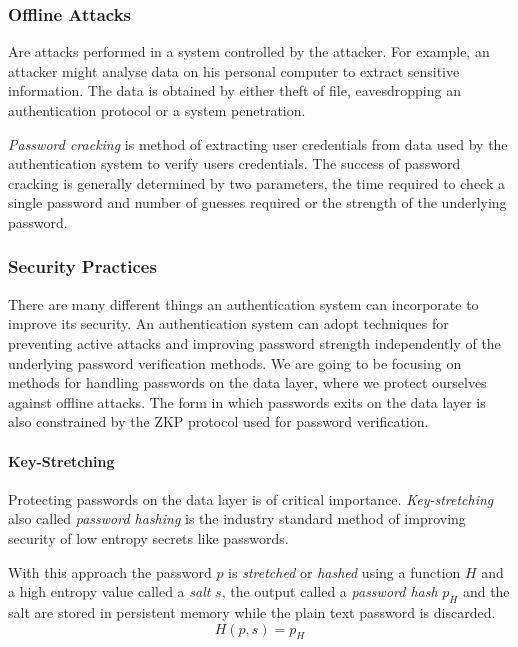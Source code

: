 \subsubsection{Offline Attacks}
Are attacks performed in a system controlled by the attacker.
For example, an attacker might analyse data on his personal computer to extract sensitive information.
The data is obtained by either theft of file, eavesdropping an authentication protocol or a system penetration.

\textit{Password cracking} \cite{blocki2018economics} is method of extracting user credentials from data used by the authentication system to verify users credentials.
The success of password cracking is generally determined by two parameters, the time required to check a single password and number of guesses required or the strength of the underlying password.

\subsubsection{Security Practices}
\label{password-security-practices}
There are many different things an authentication system can incorporate to improve its security.
An authentication system can adopt techniques for preventing active attacks and improving password strength independently of the underlying password verification methods.
We are going to be focusing on methods for handling passwords on the data layer, where we protect ourselves against offline attacks.
The form in which passwords exits on the data layer is also constrained by the ZKP protocol used for password verification.

\paragraph{Key-Stretching}
\label{paragraph:password-hashing}
Protecting passwords on the data layer is of critical importance.
\textit{Key-stretching} \cite{hornby2016salted} also called \textit{password hashing} is the industry standard method of improving security of low entropy secrets like passwords.

With this approach the password $p$ is \textit{stretched} or \textit{hashed} using a function $H$ and a high entropy value called a \textit{salt} $s$, the output called a \textit{password hash} $p_H$ and the salt are stored in persistent memory while the plain text password is discarded.
$$H(p, s) = p_H$$

